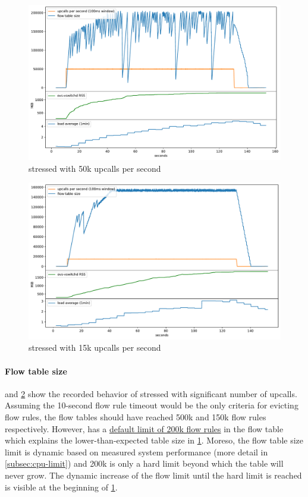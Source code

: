 \begin{figure}
    \centering
    \includegraphics[width=.9\linewidth]{img/packet_flood_bare_50k.pdf}
    \caption{ stressed with 50k upcalls per second}
    \label{fig:plot-packet-flood-bare-50k}
\end{figure}

\begin{figure}
    \centering
    \includegraphics[width=.9\linewidth]{img/packet_flood_bare_15k.pdf}
    \caption{ stressed with 15k upcalls per second}
    \label{fig:plot-packet-flood-bare-15k}
\end{figure}

\paragraph{Flow table size}
 and \cref{fig:plot-packet-flood-bare-15k} show the recorded behavior of  stressed with significant number of upcalls. Assuming the 10-second flow rule timeout would be the only criteria for evicting flow rules, the flow tables should have reached 500k and 150k flow rules respectively. However,  has a \href{https://github.com/openvswitch/ovs/blob/859071224c590207ca5e1f8723ffdef72ef7b512/ofproto/ofproto.h\#L310}{default limit of 200k flow rules} in the flow table which explains the lower-than-expected table size in \cref{fig:plot-packet-flood-bare-50k}. Moreso, the flow table size limit is dynamic based on measured system performance (more detail in \cref{subsec:cpu-limit}) and 200k is only a hard limit beyond which the table will never grow. The dynamic increase of the flow limit until the hard limit is reached is visible at the beginning of \cref{fig:plot-packet-flood-bare-50k}.

